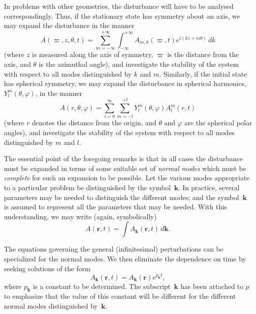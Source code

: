 In problems with other geometries, the disturbance will have to be
analysed correspondingly.  Thus, if the stationary state has symmetry
about an axis, we may expand the disturbance in the manner
\begin{equation}
\label{eq:1-4}
A(\varpi, z, \theta, t) = \sum_{m=-\infty}^{+\infty} \int_{-\infty}^{+\infty}
A_{m,k}(\varpi, t) e^{i(kz + m\theta)}\, dk
\end{equation}
(where $z$ is measured along the axis of symmetry, $\varpi$ is the distance from
the axis, and $\theta$ is the azimuthal angle), and investigate the stability of the
system with respect to all modes distinguished by $k$ and $m$.  Similarly,
if the initial state has spherical symmetry, we may expand the disturbance in spherical harmonics, $Y_l^m(\theta, \varphi)$, in the manner
\begin{equation}
\label{eq:1-5}
A(r, \theta, \varphi) = \sum_{l=0}^{\infty} \sum_{m=-l}^{+l}
Y_l^m(\theta, \varphi) A_l^m(r, t)
\end{equation}
(where $r$ denotes the distance from the origin, and $\theta$ and $\varphi$ are the
spherical polar angles), and investigate the stability of the system with
respect to all modes distinguished by $m$ and $l$.

The essential point of the foregoing remarks is that in all cases the
disturbance must be expanded in terms of some suitable set of \emph{normal
modes} which must be \emph{complete} for such an expansion to be possible.  Let
the various modes appropriate to a particular problem be distinguished
by the symbol~$\mathbf{k}$.  In practice, several parameters may be needed to
distinguish the different modes; and the symbol~$\mathbf{k}$ is assumed to represent
all the parameters that may be needed.  With this understanding, we
may write (again, symbolically)
\begin{equation}
\label{eq:1-6}
A(\mathbf{r}, t) = \int A_{\mathbf{k}}(\mathbf{r}, t)\, d\mathbf{k}.
\end{equation}

The equations governing the general (infinitesimal) perturbations
can be specialized for the normal modes.  We then eliminate the dependence on time by seeking solutions of the form
\begin{equation}
\label{eq:1-7}
A_{\mathbf{k}}(\mathbf{r}, t) = A_{\mathbf{k}}(\mathbf{r}) e^{p_{\mathbf{k}} t},
\end{equation}
where $p_{\mathbf{k}}$ is a constant to be determined.  The subscript~$\mathbf{k}$ has been
attached to $p$ to emphasize that the value of this constant will be different
for the different normal modes distinguished by~$\mathbf{k}$.

